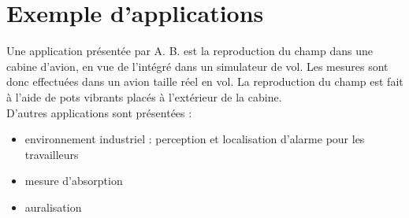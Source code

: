 \documentclass[12pt]{article}
\begin{document}
\section{Exemple d'applications}

Une application présentée par A. B. est la reproduction du champ dans une cabine d'avion, en vue de l'intégré dans un simulateur de vol. Les mesures sont donc effectuées dans un avion taille réel en vol. La reproduction du champ est fait à l'aide de pots vibrants placés à l'extérieur de la cabine.\\

D'autres applications sont présentées :
\begin{itemize}
        \item environnement industriel : perception et localisation d'alarme pour les travailleurs
        \item mesure d'absorption
        \item auralisation
\end{itemize}
\end{document}

